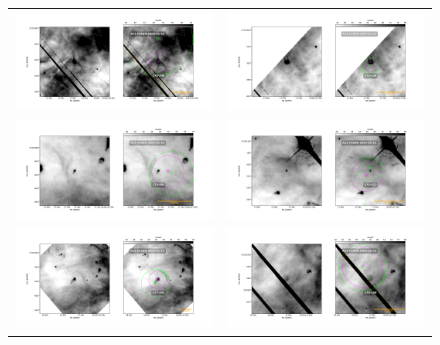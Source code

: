 \documentclass{article}
\begin{document}
\begin{figure}[htp]
\centering
\begin{tabular}{l l}
    \includegraphics[width=0.5\linewidth]{j8oc01010_wcs/170-249-Bally_01-images.pdf}
   &\includegraphics[width=0.5\linewidth]{j8oc01010_wcs/173-236-Bally_01-images.pdf}\\
   \includegraphics[width=0.5\linewidth]{j8oc01010_wcs/173-342-Bally_01-images.pdf}
   &\includegraphics[width=0.5\linewidth]{j8oc01010_wcs/175-321-Bally_01-images.pdf}\\
   \includegraphics[width=0.5\linewidth]{j8oc01010_wcs/177-341-Bally_01-images.pdf}
   &\includegraphics[width=0.5\linewidth]{j8oc01010_wcs/178-258-Bally_01-images.pdf}\\
  
 \end{tabular}
\end{figure}
\end{document}
